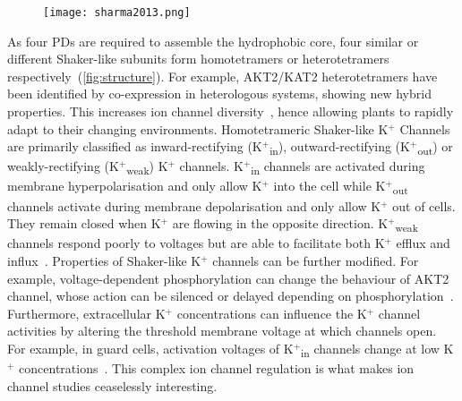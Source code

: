 \documentclass[11pt]{article}
\begin{document}
\begin{multicols*}{2}
\begin{figure*}
  \centering
    \texttt{[image: sharma2013.png]}
  \label{fig:structure}
\end{figure*}

As four PDs are required to assemble the hydrophobic core, four similar or different Shaker-like subunits form homotetramers or heterotetramers respectively~(\autoref{fig:structure}). For example, AKT2/KAT2 heterotetramers have been identified by co-expression in heterologous systems, showing new hybrid properties. This increases ion channel diversity~\citep{Xicluna2007}, hence allowing plants to rapidly adapt to their changing environments. 
\newline\newline
Homotetrameric Shaker-like K$^{+}$ Channels are primarily classified as inward-rectifying (K$^{+}$\textsubscript{in}), outward-rectifying (K$^{+}$\textsubscript{out}) or weakly-rectifying (K$^{+}$\textsubscript{weak}) K$^{+}$ channels. K$^{+}$\textsubscript{in} channels are activated during membrane hyperpolarisation and only allow K$^{+}$ into the cell while K$^{+}$\textsubscript{out} channels activate during membrane depolarisation and only allow K$^{+}$ out of cells. They remain closed when K$^{+}$ are flowing in the opposite direction. K$^{+}$\textsubscript{weak} channels respond poorly to voltages but are able to facilitate both K$^{+}$ efflux and influx~\citep{Dreyer2009}. 
\newline\newline
Properties of Shaker-like K$^{+}$ channels can be further modified. For example, voltage-dependent phosphorylation can change the behaviour of AKT2 channel, whose action can be silenced or delayed depending on phosphorylation~\citep{Dreyer2001,Michard2005a}. Furthermore, extracellular K$^{+}$ concentrations can influence the K$^{+}$ channel activities by altering the threshold membrane voltage at which channels open. For example, in guard cells, activation voltages of K$^{+}$\textsubscript{in} channels change at low K$^{+}$ concentrations~\citep{Schroeder1991}. This complex ion channel regulation is what makes ion channel studies ceaselessly interesting. 
\newline\newline

\end{multicols*}
\end{document}
